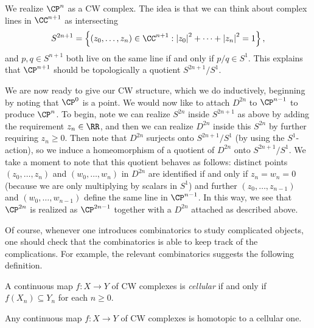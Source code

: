 \documentclass[../notes.tex]{subfiles}
\begin{document}
\begin{example}
	We realize $\CP^n$ as a CW complex. The idea is that we can think about complex lines in $\CC^{n+1}$ as intersecting
	\[S^{2n+1}=\left\{(z_0,\ldots,z_n)\in\CC^{n+1}:\left|z_0\right|^2+\cdots+\left|z_n\right|^2=1\right\},\]
	and $p,q\in S^{n+1}$ both live on the same line if and only if $p/q\in S^1$. This explains that $\CP^{n+1}$ should be topologically a quotient $S^{2n+1}/S^1$.
	
	We are now ready to give our CW structure, which we do inductively, beginning by noting that $\CP^0$ is a point. We would now like to attach $D^{2n}$ to $\CP^{n-1}$ to produce $\CP^n$. To begin, note we can realize $S^{2n}$ inside $S^{2n+1}$ as above by adding the requirement $z_n\in\RR$, and then we can realize $D^{2n}$ inside this $S^{2n}$ by further requiring $z_n\ge0$. Then note that $D^{2n}$ surjects onto $S^{2n+1}/S^1$ (by using the $S^1$-action), so we induce a homeomorphism of a quotient of $D^{2n}$ onto $S^{2n+1}/S^1$. We take a moment to note that this quotient behaves as follows: distinct points $(z_0,\ldots,z_n)$ and $(w_0,\ldots,w_n)$ in $D^{2n}$ are identified if and only if $z_n=w_n=0$ (because we are only multiplying by scalars in $S^1$) and further $(z_0,\ldots,z_{n-1})$ and $(w_0,\ldots,w_{n-1})$ define the same line in $\CP^{n-1}$. In this way, we see that $\CP^{2n}$ is realized as $\CP^{2n-1}$ together with a $D^{2n}$ attached as described above.
\end{example}
Of course, whenever one introduces combinatorics to study complicated objects, one should check that the combinatorics is able to keep track of the complications. For example, the relevant combinatorics suggests the following definition.
\begin{definition}[cellular]
	A continuous map $f\colon X\to Y$ of CW complexes is \textit{cellular} if and only if $f(X_n)\subseteq Y_n$ for each $n\ge0$.
\end{definition}
\begin{theorem}
	Any continuous map $f\colon X\to Y$ of CW complexes is homotopic to a cellular one.
\end{theorem}
\end{document}
